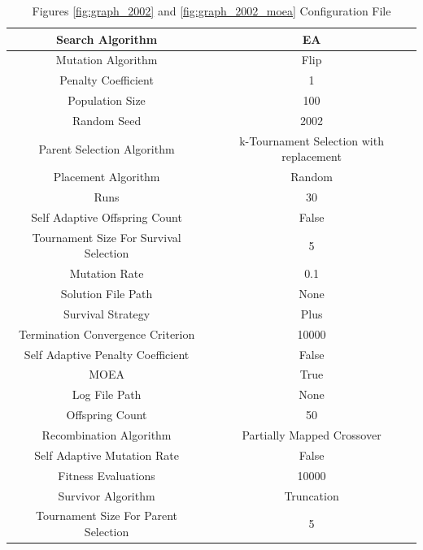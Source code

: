 \documentclass{standalone}
\begin{document}
\begin{table}[!htb]
	\centering
	\caption{Figures \ref{fig:graph_2002} and \ref{fig:graph_2002_moea} Configuration File}
	\label{tab:graph_2002}
	\begin{tabular}{| c | c |}
		\hline
		Search Algorithm		& EA		 \\
		\hline
		Mutation Algorithm		& Flip		 \\
		\hline
		Penalty Coefficient		& 1		 \\
		\hline
		Population Size		& 100		 \\
		\hline
		Random Seed		& 2002		 \\
		\hline
		Parent Selection Algorithm		& k-Tournament Selection with replacement		 \\
		\hline
		Placement Algorithm		& Random		 \\
		\hline
		Runs		& 30		 \\
		\hline
		Self Adaptive Offspring Count		& False		 \\
		\hline
		Tournament Size For Survival Selection		& 5		 \\
		\hline
		Mutation Rate		& 0.1		 \\
		\hline
		Solution File Path		& None		 \\
		\hline
		Survival Strategy		& Plus		 \\
		\hline
		Termination Convergence Criterion		& 10000		 \\
		\hline
		Self Adaptive Penalty Coefficient		& False		 \\
		\hline
		MOEA		& True		 \\
		\hline
		Log File Path		& None		 \\
		\hline
		Offspring Count		& 50		 \\
		\hline
		Recombination Algorithm		& Partially Mapped Crossover		 \\
		\hline
		Self Adaptive Mutation Rate		& False		 \\
		\hline
		Fitness Evaluations		& 10000		 \\
		\hline
		Survivor Algorithm		& Truncation		 \\
		\hline
		Tournament Size For Parent Selection		& 5		 \\
		\hline
	\end{tabular}
\end{table}
\end{document}
